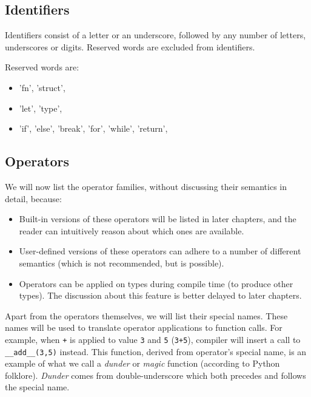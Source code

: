 \documentclass[times, utf8, diplomski]{fer}
\theoremstyle{definition}
\begin{document}
\subsection{Identifiers}

Identifiers consist of a letter or an underscore, followed by any number of letters, underscores or digits.
Reserved words are excluded from identifiers.

Reserved words are:
\begin{itemize}
    \item 'fn', 'struct',
    \item 'let', 'type',
    \item 'if', 'else', 'break', 'for', 'while', 'return',
\end{itemize}


\subsection{Operators}

We will now list the operator families, without discussing their semantics in detail, because:

\begin{itemize}
    \item Built-in versions of these operators will be listed in later chapters, and the reader
        can intuitively reason about which ones are available.
    \item User-defined versions of these operators can adhere to a number of different semantics 
        (which is not recommended, but is possible).
    \item Operators can be applied on types during compile time (to produce other types). 
        The discussion about this feature is better delayed to later chapters.
\end{itemize}

Apart from the operators themselves, we will list their special names. These names
will be used to translate operator applications to function calls. For example, when 
\texttt{+} is applied to value \texttt{3} and \texttt{5} (\texttt{3+5}), compiler
will insert a call to \texttt{\_\_add\_\_(3,5)} instead. This function, derived from operator's special name,
is an example of what we call a \textit{dunder} or \textit{magic} function (according to Python folklore).
\textit{Dunder} comes from double-underscore which both precedes and follows the special name.
\end{document}
